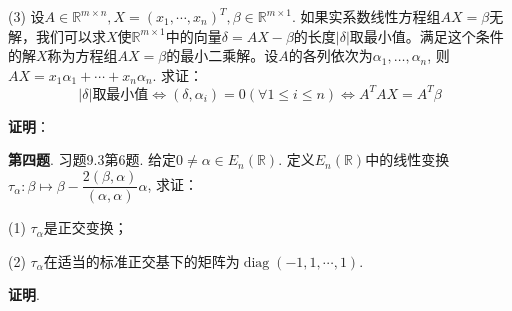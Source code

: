 (3) 设$A\in\mathbb{R}^{m\times n}, X = (x_1,\cdots,x_n)^T, \beta\in\mathbb{R}^{m\times 1}$. 如果实系数线性方程组$AX = \beta$无解，我们可以求$X$使$\mathbb{R}^{m\times 1}$中的向量$\delta = AX - \beta$的长度$\lvert \delta \rvert$取最小值。满足这个条件的解$X$称为方程组$AX = \beta$的最小二乘解。设$A$的各列依次为$\alpha_1, \ldots, \alpha_n$, 则$AX = x_1\alpha_1 + \cdots + x_n\alpha_n$. 求证：
$$\lvert \delta \rvert \text{取最小值} \Longleftrightarrow (\delta, \alpha_i) = 0 (\forall 1\leqslant i \leqslant n) \Longleftrightarrow A^TAX = A^T\beta$$

\newpageorvspace

{\bf 证明}：


\newpageorvspace


{\bf 第四题}. 习题9.3第6题. 给定$0 \neq \alpha \in E_n(\mathbb{R})$. 定义$E_n(\mathbb{R})$中的线性变换$\tau_{\alpha}: \beta \mapsto \beta - \dfrac{2(\beta, \alpha)}{(\alpha, \alpha)} \alpha$, 求证：

(1) $\tau_{\alpha}$是正交变换；

(2) $\tau_{\alpha}$在适当的标准正交基下的矩阵为$\operatorname{diag}(-1, 1, \cdots, 1)$.

\newpageorvspace

{\bf 证明}. 


